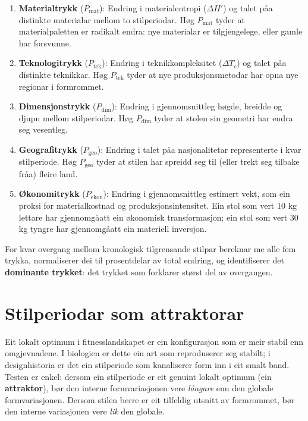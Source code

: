 \documentclass[10pt, a4paper, twocolumn]{article}
\begin{document}
\begin{enumerate}
  \item \textbf{Materialtrykk} ($P_{\text{mat}}$): Endring i materialentropi ($\Delta H'$) og talet p\r{a}a distinkte materialar mellom to stilperiodar. H\o g $P_{\text{mat}}$ tyder at materialpaletten er radikalt endra: nye materialar er tilgjengelege, eller gamle har forsvunne.

  \item \textbf{Teknologitrykk} ($P_{\text{tek}}$): Endring i teknikkompleksitet ($\Delta T_c$) og talet p\r{a}a distinkte teknikkar. H\o g $P_{\text{tek}}$ tyder at nye produksjonsmetodar har opna nye regionar i formrommet.

  \item \textbf{Dimensjonstrykk} ($P_{\text{dim}}$): Endring i gjennomsnittleg h\o gde, breidde og djupn mellom stilperiodar. H\o g $P_{\text{dim}}$ tyder at stolen sin geometri har endra seg vesentleg.

  \item \textbf{Geografitrykk} ($P_{\text{geo}}$): Endring i talet p\r{a}a nasjonalitetar representerte i kvar stilperiode. H\o g $P_{\text{geo}}$ tyder at stilen har spreidd seg til (eller trekt seg tilbake fr\r{a}a) fleire land.

  \item \textbf{\O konomitrykk} ($P_{\text{ekon}}$): Endring i gjennomsnittleg estimert vekt, som ein proksi for materialkostnad og produksjonsintensitet. Ein stol som vert 10 kg lettare har gjennomg\r{a}att ein \o konomisk transformasjon; ein stol som vert 30 kg tyngre har gjennomg\r{a}att ein materiell inversjon.
\end{enumerate}

For kvar overgang mellom kronologisk tilgrensande stilpar bereknar me alle fem trykka, normaliserer dei til prosentdelar av total endring, og identifiserer det \textbf{dominante trykket}: det trykket som forklarer st\o rst del av overgangen.


\section{Stilperiodar som attraktorar}

Eit lokalt optimum i fitnesslandskapet er ein konfigurasjon som er meir stabil enn omgjevnadene. I biologien er dette ein art som reproduserer seg stabilt; i designhistoria er det ein stilperiode som kanaliserer form inn i eit smalt band. Testen er enkel: dersom ein stilperiode er eit genuint lokalt optimum (ein \textbf{attraktor}), b\o r den interne formvariasjonen vere \emph{l\r{a}agare} enn den globale formvariasjonen. Dersom stilen berre er eit tilfeldig utsnitt av formrommet, b\o r den interne variasjonen vere \emph{lik} den globale.
\end{document}
